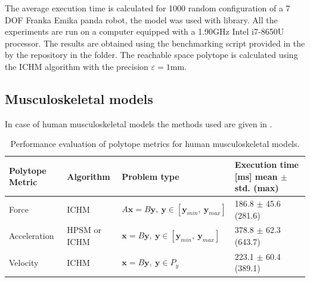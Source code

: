 
The average execution time is calculated for 1000 random configuration of a 7 DOF Franka Emika panda robot, the model was used with  \cite{pinocchio2021} library. All the experiments are run on a computer equipped with a 1.90GHz Intel i7-8650U processor. The results are obtained using the benchmarking script provided in the by the repository in the  folder.  The reachable space polytope is calculated using the ICHM algorithm with the precision $\varepsilon=1$mm. 

\subsection{Musculoskeletal models}

In case of human musculoskeletal models the methods used are given in .
\begin{table}[h]
\centering
\begin{tabular}{|l|l|l|l|}
\hline
Polytope Metric & Algorithm & Problem type & \makecell[c]{Execution time [ms] \\ mean $\pm$ std. (max)} \\
\hline
Force & ICHM & $A\bm{x}=B\bm{y},~ \bm{y} \in [\bm{y}_{min}, ~\bm{y}_{max}]$ & 186.8 $\pm$ 45.6 (281.6) \\
Acceleration & HPSM or ICHM & $\bm{x}=B\bm{y},~ \bm{y} \in [\bm{y}_{min}, ~\bm{y}_{max}]$ & 378.8 $\pm$ 62.3 (643.7) \\
Velocity & ICHM & $\bm{x}=B\bm{y},~ \bm{y} \in P_{y}$ & 223.1 $\pm$ 60.4 (389.1) \\
\hline
\end{tabular}
\caption{Performance evaluation of polytope metrics for human musculoskeletal models.}
\label{tab:methods_humans}
\end{table}

